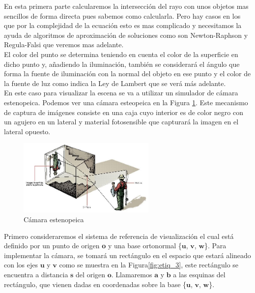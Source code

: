 	En esta primera parte calcularemos la intersección del rayo con unos objetos mas sencillos de forma directa pues sabemos como calcularla. Pero hay casos en los que por la complejidad de la ecuación esto es mas complicado y necesitamos la ayuda de algoritmos de aproximación de soluciones como son Newton-Raphson y Regula-Falsi que veremos mas adelante.
	${ }$\\
	
El color del punto se determina teniendo en cuenta el color de la superficie en dicho punto y, añadiendo la iluminación, también se considerará el ángulo que forma la fuente de iluminación con la normal del objeto en ese punto y el color de la fuente de luz como indica la Ley de Lambert que se verá más adelante.
	${ }$\\	

En este caso para visualizar la escena se va a utilizar un simulador de cámara estenopeica. Podemos ver una cámara esteopeica en la Figura \ref{fig:etiq_1}. Este mecanismo de captura de imágenes consiste en una caja cuyo interior es de color negro con un agujero en un lateral y material fotosensible que capturará la imagen en el lateral opuesto.
	${ }$\\	


\begin{figure}
	\begin{center}
		\includegraphics[width=0.6\textwidth]{imagenes/camara-estenopeica.jpg}
	\end{center}
	\caption{Cámara estenopeica}
	\label{fig:etiq_1}
\end{figure}

Primero consideraremos el sistema de referencia de visualización el cual está definido por un punto de origen \textbf{o} y una base ortonormal \{$\textbf{u}$, $\textbf{v}$, $\textbf{w}$\}. Para implementar la cámara, se tomará un rectángulo en el espacio que estará alineado con los ejes $\textbf{u}$ y $\textbf{v}$ como se muestra en la Figura\ref{fig:etiq_3}, este rectángulo se encuentra a distancia $\textbf{s}$ del origen $\textbf{o}$. Llamaremos $\textbf{a}$ y $\textbf{b}$ a las esquinas del rectángulo, que vienen dadas en coordenadas sobre la base \{$\textbf{u}$, $\textbf{v}$, $\textbf{w}$\}.
	${ }$\\

